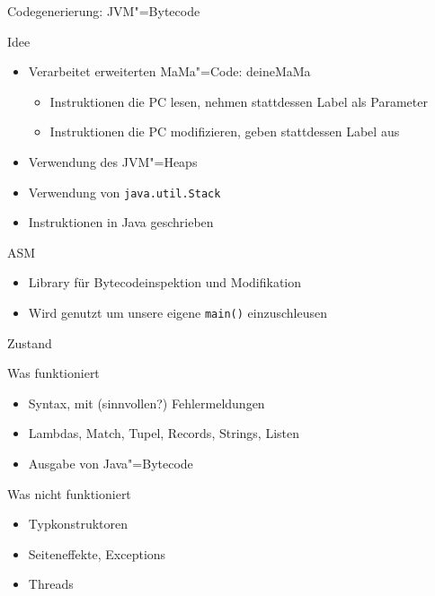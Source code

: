 \documentclass[hyperref={pdfpagelabels=false}]{beamer}
\begin{document}
\begin{frame}{Codegenerierung: JVM"=Bytecode}
  \begin{block}{Idee}
    \begin{itemize}
      \item Verarbeitet erweiterten MaMa"=Code: deineMaMa
        \begin{itemize}
          \item Instruktionen die PC lesen, nehmen stattdessen Label als Parameter
          \item Instruktionen die PC modifizieren, geben stattdessen Label aus
        \end{itemize}
      \item Verwendung des JVM"=Heaps
      \item Verwendung von \texttt{java.util.Stack}
      \item Instruktionen in Java geschrieben
    \end{itemize}
  \end{block}
  \begin{block}{ASM}
    \begin{itemize}
      \item Library für Bytecodeinspektion und Modifikation
      \item Wird genutzt um unsere eigene \texttt{main()} einzuschleusen
    \end{itemize}
  \end{block}
\end{frame}

\begin{frame}{Zustand}
  \begin{exampleblock}{Was funktioniert}
    \begin{itemize}
      \item Syntax, mit (sinnvollen?) Fehlermeldungen
      \item Lambdas, Match, Tupel, Records, Strings, Listen
      \item Ausgabe von Java"=Bytecode
    \end{itemize}
  \end{exampleblock}
  \begin{alertblock}{Was nicht funktioniert}
    \begin{itemize}
      \item Typkonstruktoren
      \item Seiteneffekte, Exceptions
      \item Threads
    \end{itemize}
  \end{alertblock}
\end{frame}
\end{document}
